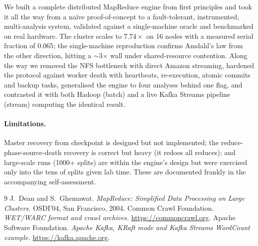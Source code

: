 \documentclass[11pt,a4paper]{article}
\begin{document}
We built a complete distributed MapReduce engine from first principles and took
it all the way from a naïve proof-of-concept to a fault-tolerant, instrumented,
multi-analysis system, validated against a single-machine oracle and benchmarked
on real hardware. The cluster scales to $7.74\times$ on 16 nodes with a measured
serial fraction of $0.065$; the single-machine reproduction confirms Amdahl's law
from the other direction, hitting a $\sim$3$\times$ wall under shared-resource
contention. Along the way we removed the NFS bottleneck with direct Amazon
streaming, hardened the protocol against worker death with heartbeats,
re-execution, atomic commits and backup tasks, generalised the engine to four
analyses behind one flag, and contrasted it with both Hadoop (batch) and a live
Kafka Streams pipeline (stream) computing the identical result.

\paragraph{Limitations.} Master recovery from checkpoint is designed but
not implemented; the reduce-phase-source-death recovery is correct but heavy
(it redoes all reduces); and large-scale runs (1000+ splits) are within the
engine's design but were exercised only into the tens of splits given lab time.
These are documented frankly in the accompanying self-assessment.

\begin{thebibliography}{9}
 J.~Dean and S.~Ghemawat. \emph{MapReduce: Simplified Data
Processing on Large Clusters.} OSDI'04, San Francisco, 2004.
 Common Crawl Foundation. \emph{WET/WARC format and crawl
archives.} \url{https://commoncrawl.org}.
 Apache Software Foundation. \emph{Apache Kafka, KRaft mode and
Kafka Streams WordCount example.} \url{https://kafka.apache.org}.
\end{thebibliography}
\end{document}
